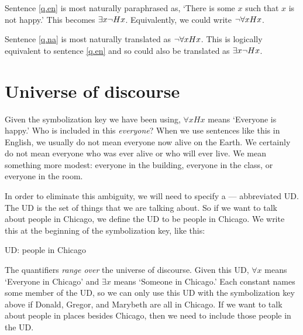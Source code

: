 Sentence \ref{q.en} is most naturally paraphrased as, `There is some $x$ such that $x$ is not happy.' This becomes $\exists x \neg Hx$. Equivalently, we could write $\neg\forall x Hx$.

Sentence \ref{q.na} is most naturally translated as $\neg\forall x Hx$. This is logically equivalent to sentence \ref{q.en} and so could also be translated as $\exists x \neg Hx$.



\section{Universe of discourse}
Given the symbolization key we have been using, $\forall xHx$ means `Everyone is happy.' Who is included in this \emph{everyone}? When we use sentences like this in English, we usually do not mean everyone now alive on the Earth. We certainly do not mean everyone who was ever alive or who will ever live. We mean something more modest: everyone in the building, everyone in the class, or everyone in the room.

In order to eliminate this ambiguity, we will need to specify a  --- abbreviated UD. The UD is the set of things that we are talking about. So if we want to talk about people in Chicago, we define the UD to be people in Chicago. We write this at the beginning of the symbolization key, like this:
\begin{ekey}
\item[UD:] people in Chicago
\end{ekey}
The quantifiers \emph{range over} the universe of discourse. Given this UD, $\forall x$ means `Everyone in Chicago' and $\exists x$ means `Someone in Chicago.' Each constant names some member of the UD, so we can only use this UD with the symbolization key above if Donald, Gregor, and Marybeth are all in Chicago. If we want to talk about people in places besides Chicago, then we need to include those people in the UD.

